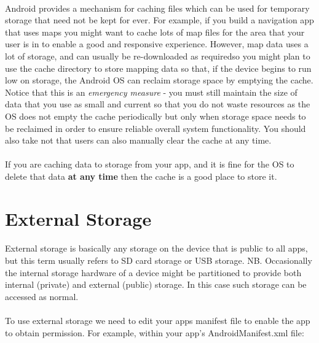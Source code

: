 \paragraph{} Android provides a mechanism for caching files which can be used for temporary storage that need not be kept for ever. For example, if you build a navigation app that uses maps you might want to cache lots of map files for the area that your user is in to enable a good and responsive experience. However, map data uses a lot of storage, and can usually be re-downloaded as requiredso you might plan to use the cache directory to store mapping data so that, if the device begins to run low on storage, the Android OS can reclaim storage space by emptying the cache. Notice that this is an {\emph{emergency measure}} - you must still maintain the size of data that you use as small and current so that you do not waste resources as the OS does not empty the cache periodically but only when storage space needs to be reclaimed in order to ensure reliable overall system functionality. You should also take not that users can also manually clear the cache at any time.

\paragraph{} If you are caching data to storage from your app, and it is fine for the OS to delete that data {\bf{at any time}} then the cache is a good place to store it.

\section{External Storage}
\paragraph{} External storage is basically any storage on the device that is public to all apps, but this term usually refers to SD card storage or USB storage. NB. Occasionally the internal storage hardware of a device might be partitioned to provide both internal (private) and external (public) storage. In this case such storage can be accessed as normal.

\paragraph{} To use external storage we need to edit your apps manifest file to enable the app to obtain permission. For example, within your app's AndroidManifest.xml file:

